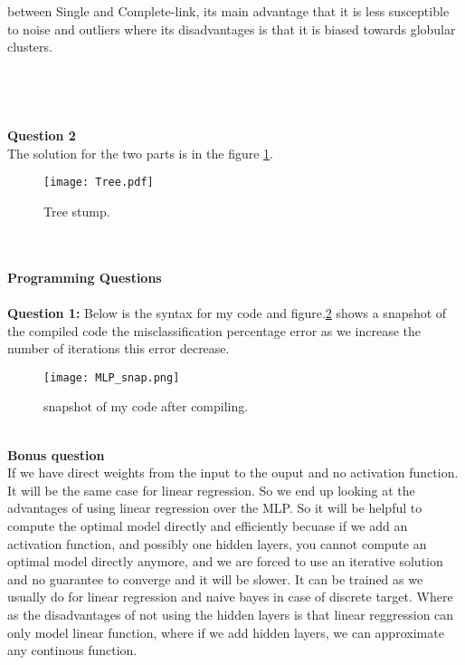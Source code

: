 \documentclass{article}
\begin{document}
  between Single and Complete-link, its main advantage that it is less susceptible
   to noise and outliers where its disadvantages is that it is biased towards
   globular clusters.\\
\\
\\
\\
\\
\textbf{Question 2}
\\
The solution for the two parts is in the figure \ref{Tree}.
\begin{figure}
  \texttt{[image: Tree.pdf]}
  \caption{Tree stump.}
\label{Tree}
\end{figure}
\\
\\
\textbf{Programming Questions}
\\
\\
\textbf{Question 1:}
\newline
Below is the syntax for my code and figure.\ref{MLP_snap} shows a snapshot of the compiled code the misclassification percentage error as we increase
the number of iterations this error decrease.
\begin{figure}
  \texttt{[image: MLP\_snap.png]}
  \caption{snapshot of my code after compiling.}
\label{MLP_snap}
\end{figure}


\\
\textbf{Bonus question}\\
If we have direct weights from the input to the ouput and no activation function. It will be the same case for linear regression. So we end up looking at the
advantages of using linear regression over the MLP. So it will be helpful to compute the optimal model directly and efficiently becuase if we add an activation function, and possibly one hidden layers, you cannot compute an optimal model directly anymore,
and we are forced to use an iterative solution and no guarantee to converge and it will be slower. It can be trained as we usually do for linear regression and naive bayes in case of
discrete target. Where as the disadvantages of not using the hidden layers is that linear reggression can only model linear function, where if we add hidden layers, we can
approximate any continous function. 
\end{document}
